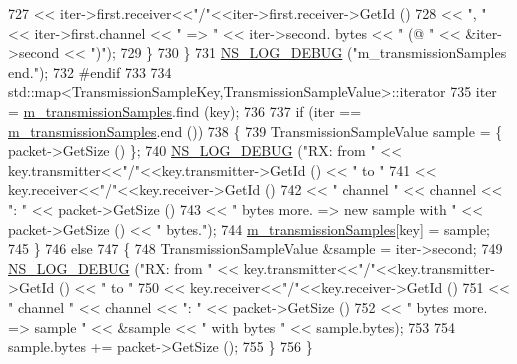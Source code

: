 \begin{DoxyCode}
727                                                << iter->first.receiver<<\textcolor{stringliteral}{"/"}<<iter->first.receiver->GetId ()
728                                                << \textcolor{stringliteral}{", "} << iter->first.channel << \textcolor{stringliteral}{" => "} << iter->second.
      bytes << \textcolor{stringliteral}{" (@ "} << &iter->second << \textcolor{stringliteral}{")"});
729         \}
730     \}
731   \hyperlink{group__logging_ga413f1886406d49f59a6a0a89b77b4d0a}{NS\_LOG\_DEBUG} (\textcolor{stringliteral}{"m\_transmissionSamples end."});
732 \textcolor{preprocessor}{#endif}
733 
734   std::map<TransmissionSampleKey,TransmissionSampleValue>::iterator
735     iter = \hyperlink{classns3_1_1PyViz_ab5e919d5d58fc6088fc94f5792a34225}{m\_transmissionSamples}.find (key);
736 
737   \textcolor{keywordflow}{if} (iter == \hyperlink{classns3_1_1PyViz_ab5e919d5d58fc6088fc94f5792a34225}{m\_transmissionSamples}.end ())
738     \{
739       TransmissionSampleValue sample = \{ packet->GetSize () \};
740       \hyperlink{group__logging_ga413f1886406d49f59a6a0a89b77b4d0a}{NS\_LOG\_DEBUG} (\textcolor{stringliteral}{"RX: from "} << key.transmitter<<\textcolor{stringliteral}{"/"}<<key.transmitter->GetId () << \textcolor{stringliteral}{" to "}
741                                 << key.receiver<<\textcolor{stringliteral}{"/"}<<key.receiver->GetId ()
742                                 << \textcolor{stringliteral}{" channel "} << channel << \textcolor{stringliteral}{": "} << packet->GetSize ()
743                                 << \textcolor{stringliteral}{" bytes more. => new sample with "} << packet->GetSize () << \textcolor{stringliteral}{" bytes."});
744       \hyperlink{classns3_1_1PyViz_ab5e919d5d58fc6088fc94f5792a34225}{m\_transmissionSamples}[key] = sample;
745     \}
746   \textcolor{keywordflow}{else}
747     \{
748       TransmissionSampleValue &sample = iter->second;
749       \hyperlink{group__logging_ga413f1886406d49f59a6a0a89b77b4d0a}{NS\_LOG\_DEBUG} (\textcolor{stringliteral}{"RX: from "} << key.transmitter<<\textcolor{stringliteral}{"/"}<<key.transmitter->GetId () << \textcolor{stringliteral}{" to "}
750                                 << key.receiver<<\textcolor{stringliteral}{"/"}<<key.receiver->GetId ()
751                                 << \textcolor{stringliteral}{" channel "} << channel << \textcolor{stringliteral}{": "} << packet->GetSize ()
752                                 << \textcolor{stringliteral}{" bytes more. => sample "} << &sample << \textcolor{stringliteral}{" with bytes "} << sample.bytes);
753 
754       sample.bytes += packet->GetSize ();
755     \}
756 \}
\end{DoxyCode}


